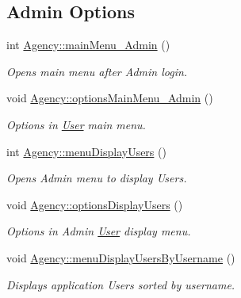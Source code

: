 \subsection*{Admin Options}
\begin{DoxyCompactItemize}
\item 
int \hyperlink{group___agency_ga1c4e64231b979f1a1bc4881ebf3e3aed}{Agency\+::main\+Menu\+\_\+\+Admin} ()
\begin{DoxyCompactList}\small\item\em Opens main menu after Admin login. \end{DoxyCompactList}\item 
\mbox{\label{group___agency_ga624b23c124d1002f6937b2a006c46834}} 
void \hyperlink{group___agency_ga624b23c124d1002f6937b2a006c46834}{Agency\+::options\+Main\+Menu\+\_\+\+Admin} ()
\begin{DoxyCompactList}\small\item\em Options in \hyperlink{class_user}{User} main menu. \end{DoxyCompactList}\item 
\mbox{\label{group___agency_gabe52082b4fcaed078b3505f627e6bbbf}} 
int \hyperlink{group___agency_gabe52082b4fcaed078b3505f627e6bbbf}{Agency\+::menu\+Display\+Users} ()
\begin{DoxyCompactList}\small\item\em Opens Admin menu to display Users. \end{DoxyCompactList}\item 
\mbox{\label{group___agency_gacea7e0ae6d04651406786f966cf10cab}} 
void \hyperlink{group___agency_gacea7e0ae6d04651406786f966cf10cab}{Agency\+::options\+Display\+Users} ()
\begin{DoxyCompactList}\small\item\em Options in Admin \hyperlink{class_user}{User} display menu. \end{DoxyCompactList}\item 
\mbox{\label{group___agency_gad1043b390ee14a047d4f8a65a0a87851}} 
void \hyperlink{group___agency_gad1043b390ee14a047d4f8a65a0a87851}{Agency\+::menu\+Display\+Users\+By\+Username} ()
\begin{DoxyCompactList}\small\item\em Displays application Users sorted by username. \end{DoxyCompactList}\item 

\end{DoxyCompactItemize}
